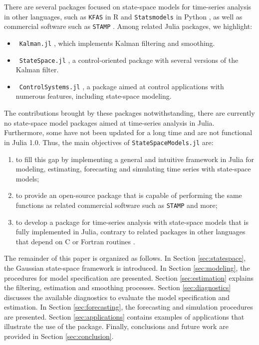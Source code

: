 \documentclass{juliacon}
\begin{document}
There are several packages focused on state-space models for time-series analysis in other languages, such as \texttt{KFAS} in R \cite{kfas} and \texttt{Statsmodels} in Python \cite{seabold2010statsmodels}, as well as commercial software such as \texttt{STAMP} \cite{koopman2000stamp}. Among related Julia packages, we highlight:
\begin{itemize}
    \item ~\texttt{Kalman.jl} \cite{kalmanjl}, which implements Kalman filtering and smoothing.
    \item ~\texttt{StateSpace.jl} \cite{statespacejl}, a control-oriented package with several versions of the Kalman filter.
    \item ~\texttt{ControlSystems.jl} \cite{controlsystemsjl}, a package aimed at control applications with numerous features, including state-space modeling.
\end{itemize}

The contributions brought by these packages notwithstanding, there are currently no state-space model packages aimed at time-series analysis in Julia. Furthermore, some have not been updated for a long time and are not functional in Julia 1.0. Thus, the main objectives of \texttt{StateSpaceModels.jl} \cite{statespacemodels} are:

\begin{enumerate}
    \item to fill this gap by implementing a general and intuitive framework in Julia for modeling, estimating, forecasting and simulating time series with state-space models;
    \item to provide an open-source package that is capable of performing the same functions as related commercial software such as \texttt{STAMP} and more;
    \item to develop a package for time-series analysis with state-space models that is fully implemented in Julia, contrary to related packages in other languages that depend on C or Fortran \mbox{routines} \cite{kfas}.
\end{enumerate}

The remainder of this paper is organized as follows. In Section \ref{sec:statespace}, the Gaussian state-space framework is introduced. In Section \ref{sec:modeling}, the procedures for model specification are presented. Section \ref{sec:estimation} explains the filtering, estimation and smoothing processes. Section \ref{sec:diagnostics} discusses the available diagnostics to evaluate the model specification and estimation. In Section \ref{sec:forecasting}, the forecasting and simulation procedures are presented. Section \ref{sec:applications} contains examples of applications that illustrate the use of the package. Finally, conclusions and future work are provided in Section \ref{sec:conclusion}.
\end{document}
